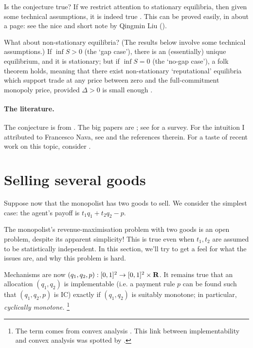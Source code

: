 Is the conjecture true?
If we restrict attention to stationary equilibria,
then given some technical assumptions,
it is indeed true \parencite{GulSonnenscheinWilson1986}.
This can be proved easily, in about a page: see the nice and short note by Qingmin Liu (\citeyear{Liu2015}).

What about non-stationary equilibria?
(The results below involve some technical assumptions.)
If $\inf S > 0$ (the `gap case'), there is an (essentially) unique equilibrium, and it is stationary;
but if $\inf S = 0$ (the `no-gap case'), a folk theorem holds, 
meaning that there exist non-stationary `reputational' equilibria
which support trade at any price between zero and the full-commitment monopoly price, provided $\Delta>0$ is small enough \parencite{GulSonnenscheinWilson1986,AusubelDeneckere1989}.


\paragraph{The literature.}
The conjecture is from \textcite{Coase1972}.
The big papers are \textcite{FudenbergLevineTirole1985,GulSonnenscheinWilson1986,AusubelDeneckere1989};
see \textcite{AusubelCramtonDeneckere2002} for a survey.
For the intuition I attributed to Francesco Nava, see \textcite{NavaSchiraldi2019} and the references therein.
For a taste of recent work on this topic, consider \textcite{DovalSkreta2021,BrzustowskiGeorgiadisharrisSzentes2023,LomysYamashita2022}.



\section{Selling several goods}
\label{sec:ch1:multi-d}

Suppose now that the monopolist has two goods to sell.
We consider the simplest case: the agent's payoff is $t_1 q_1 + t_2 q_2 - p$.

The monopolist's revenue-maximisation problem with two goods is an open problem, despite its apparent simplicity!
This is true even when $t_1,t_2$ are assumed to be statistically independent.
In this section, we'll try to get a feel for what the issues are, and why this problem is hard.

Mechanisms are now $(q_1,q_2,p) : [0,1]^2 \to [0,1]^2 \times \mathbf{R}$.
It remains true that an allocation $(q_1,q_2)$ is implementable (i.e. a payment rule $p$ can be found such that $(q_1,q_2,p)$ is IC)
exactly if $(q_1,q_2)$ is suitably monotone;
in particular, \emph{cyclically monotone.}%
	\footnote{The term comes from convex analysis \parencite[see][]{Rockafellar1970}. This link between implementability and convex analysis was spotted by \textcite{Rochet1987}.}

